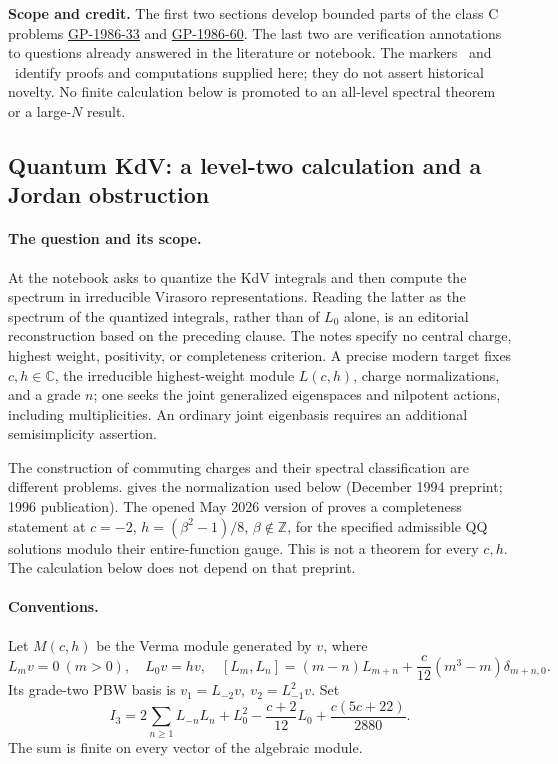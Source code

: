 \noindent\textbf{Scope and credit.}
The first two sections develop bounded parts of the class C problems
\hyperref[prob:GP-1986-33]{GP-1986-33} and
\hyperref[prob:GP-1986-60]{GP-1986-60}. The last two are verification
annotations to questions already answered in the literature or notebook.
The markers \ours\ and \oursComputed\ identify proofs and computations
supplied here; they do not assert historical novelty. No finite calculation
below is promoted to an all-level spectral theorem or a large-\(N\) result.

\subsection{Quantum KdV: a level-two calculation and a Jordan obstruction}
\label{dev:kdv}

\paragraph{The question and its scope.}
At  the notebook asks to quantize the KdV integrals
and then compute the spectrum in irreducible Virasoro representations.
Reading the latter as the spectrum of the quantized integrals, rather
than of \(L_0\) alone, is an editorial reconstruction based on the
preceding clause. The notes specify no central charge, highest weight,
positivity, or completeness criterion. A precise modern target fixes
\(c,h\in\mathbb C\), the irreducible highest-weight module \(L(c,h)\),
charge normalizations, and a grade \(n\); one seeks the joint generalized
eigenspaces and nilpotent actions, including multiplicities. An ordinary
joint eigenbasis requires an additional semisimplicity assertion.

The construction of commuting charges and their spectral classification
are different problems.
\citet[eq.~(11)]{bazhanovlukyanovzamolodchikov1996integrable}
gives the normalization used below (December 1994 preprint; 1996
publication). The opened May 2026 version of
\citet[Definitions~6.5--6.6 and Theorem~6.8]{masoeroruzza2026odeim}
proves a completeness statement at \(c=-2\),
\(h=(\beta^2-1)/8\), \(\beta\notin\mathbb Z\), for the specified
admissible QQ solutions modulo their entire-function gauge.
This is not a theorem for every \(c,h\). The calculation below
does not depend on that preprint.

\paragraph{Conventions.}
Let \(M(c,h)\) be the Verma module generated by \(v\), where
\[
 L_mv=0\ (m>0),\quad L_0v=hv,\quad
 [L_m,L_n]=(m-n)L_{m+n}
       +\frac c{12}(m^3-m)\delta_{m+n,0}.
\]
Its grade-two PBW basis is \(v_1=L_{-2}v,\ v_2=L_{-1}^2v\). Set
\[
 I_3=2\sum_{n\geq1}L_{-n}L_n+
       L_0^2-\frac{c+2}{12}L_0+\frac{c(5c+22)}{2880}.
\]
The sum is finite on every vector of the algebraic module.

